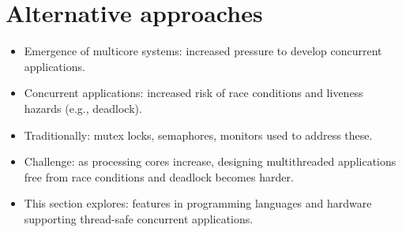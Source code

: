 \section{Alternative approaches}

\begin{itemize}
    \item Emergence of multicore systems: increased pressure to develop concurrent applications.
    \item Concurrent applications: increased risk of race conditions and liveness hazards (e.g., deadlock).
    \item Traditionally: mutex locks, semaphores, monitors used to address these.
    \item Challenge: as processing cores increase, designing multithreaded applications free from race conditions and deadlock becomes harder.
    \item This section explores: features in programming languages and hardware supporting thread-safe concurrent applications.
\end{itemize}

